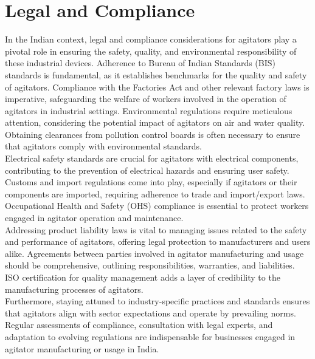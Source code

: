 \documentclass[a4,10pt]{report}
\begin{document}
\section{Legal and Compliance}
In the Indian context, legal and compliance considerations for agitators play a pivotal role in ensuring the safety, quality, and environmental responsibility of these industrial devices. Adherence to Bureau of Indian Standards (BIS) standards is fundamental, as it establishes benchmarks for the quality and safety of agitators. Compliance with the Factories Act and other relevant factory laws is imperative, safeguarding the welfare of workers involved in the operation of agitators in industrial settings. Environmental regulations require meticulous attention, considering the potential impact of agitators on air and water quality. Obtaining clearances from pollution control boards is often necessary to ensure that agitators comply with environmental standards.
\vspace{2mm} \\
Electrical safety standards are crucial for agitators with electrical components, contributing to the prevention of electrical hazards and ensuring user safety. Customs and import regulations come into play, especially if agitators or their components are imported, requiring adherence to trade and import/export laws. Occupational Health and Safety (OHS) compliance is essential to protect workers engaged in agitator operation and maintenance.
\vspace{2mm} \\
Addressing product liability laws is vital to managing issues related to the safety and performance of agitators, offering legal protection to manufacturers and users alike. Agreements between parties involved in agitator manufacturing and usage should be comprehensive, outlining responsibilities, warranties, and liabilities. ISO certification for quality management adds a layer of credibility to the manufacturing processes of agitators.
\vspace{2mm} \\
Furthermore, staying attuned to industry-specific practices and standards ensures that agitators align with sector expectations and operate by prevailing norms. Regular assessments of compliance, consultation with legal experts, and adaptation to evolving regulations are indispensable for businesses engaged in agitator manufacturing or usage in India.\cite{legal}

\end{document}
